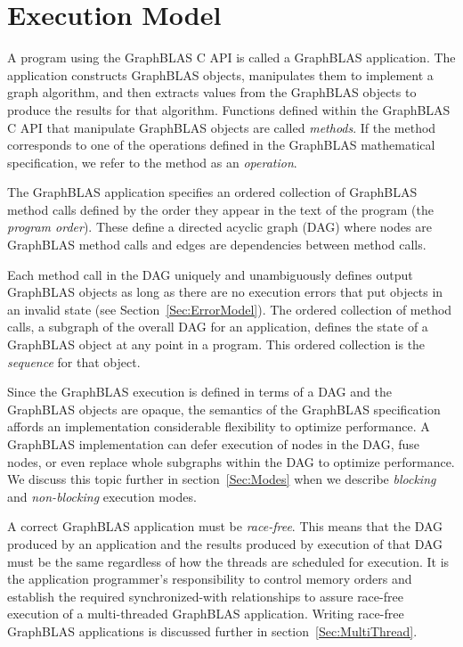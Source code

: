 

\section{Execution Model}
\label{Sec:ExecutionModel}

A program using the GraphBLAS C API is called
a GraphBLAS application.  The application constructs GraphBLAS objects,
manipulates them to implement a graph algorithm, and then extracts
values from the GraphBLAS objects to produce the results for that algorithm. 
Functions defined within the GraphBLAS C API that manipulate GraphBLAS
objects are called \emph{methods}.  If the method corresponds to one
of the operations defined in the GraphBLAS mathematical specification,
we refer to the method as an \emph{operation}.

The GraphBLAS application specifies an ordered collection of 
GraphBLAS method calls defined by the order
they appear in the text of the program (the \emph{program order}).  
These define a directed acyclic graph (DAG) where nodes are GraphBLAS
method calls and edges are dependencies between method calls.  

Each method call in the DAG uniquely and unambiguously defines output
GraphBLAS objects as long as there are no execution errors that
put objects in an invalid state (see Section~\ref{Sec:ErrorModel}).
The ordered collection of method calls, a subgraph of the overall DAG for an application,
defines the state of a GraphBLAS object at any point in a program.  This ordered collection 
is the \emph{sequence} for that object.  

Since the GraphBLAS execution is defined in terms of a DAG and the 
GraphBLAS objects are opaque, the semantics of the GraphBLAS specification
affords an implementation considerable flexibility 
to optimize performance.  A GraphBLAS implementation can defer execution 
of nodes in the DAG, fuse nodes, or even replace whole subgraphs within the DAG 
to optimize performance.  We discuss this topic further in section~\ref{Sec:Modes} when we 
describe  \emph{blocking} and \emph{non-blocking} execution modes.

A correct GraphBLAS application must be \emph{race-free}.  This means that the DAG 
produced by an application and the results produced by execution of that DAG must be the same
regardless of how the threads are scheduled for execution.  It is the application programmer's 
responsibility to control memory orders and establish the required synchronized-with
relationships to assure race-free execution of a multi-threaded GraphBLAS 
application.  Writing race-free GraphBLAS applications is discussed further in section~\ref{Sec:MultiThread}.

